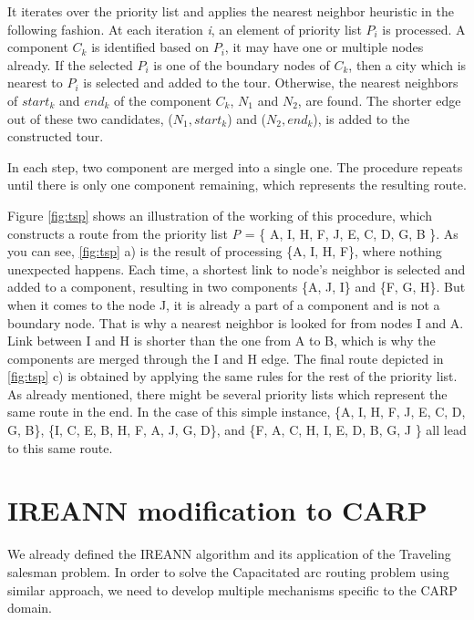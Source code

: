 \documentclass[twoside]{ctuthesis}
\theoremstyle{plain}
\theoremstyle{definition}
\theoremstyle{note}
\begin{document}
It iterates over the priority list and applies the nearest neighbor heuristic in the following fashion. At each iteration \emph{i}, an element of priority list \emph{$ P_i $} is processed. A component \emph{$ C_k $} is identified based on \emph{$ P_i $}, it may have one or multiple nodes already. If the selected \emph{$ P_i $} is one of the boundary nodes of \emph{$ C_k $}, then a city which is nearest to \emph{$ P_i $} is selected and added to the tour. Otherwise, the nearest neighbors of \emph{$ start_k $} and \emph{$ end_k $} of the component \emph{$ C_k $}, \emph{$ N_1 $} and \emph{$ N_2 $}, are found.
The shorter edge out of these two candidates, (\emph{$ N_1, start_k $}) and (\emph{$ N_2, end_k $}), is added to the constructed tour. 

In each step, two component are merged into a single one. The procedure repeats until there is only one component remaining, which represents the resulting route.

Figure \ref{fig:tsp} shows an illustration of the working of this procedure, which constructs a route from the priority list \emph{P} = \{ A, I, H, F, J, E, C, D, G, B \}. As you can see, \ref{fig:tsp} a) is the result of processing \{A, I, H, F\}, where nothing unexpected happens. Each time, a shortest link to node's neighbor is selected and added to a component, resulting in two components \{A, J, I\} and \{F, G, H\}. But when it comes to the node J, it is already a part of a component and is not a boundary node. That is why a nearest neighbor is looked for from nodes I and A. Link between I and H is shorter than the one from A to B, which is why the components are merged through the I and H edge. The final route depicted in \ref{fig:tsp} c) is obtained by applying the same rules for the rest of the priority list.
As already mentioned, there might be several priority lists which represent the same route in the end. In the case of this simple instance,  \{A, I, H, F, J, E, C, D, G, B\}, \{I, C, E, B, H, F, A, J, G, D\}, and \{F, A, C, H, I, E, D, B, G, J \} all lead to this same route. 

\section{IREANN modification to CARP}
We already defined the IREANN algorithm and its application of the Traveling salesman problem. In order to solve the Capacitated arc routing problem using similar approach, we need to develop multiple mechanisms specific to the CARP domain.
\end{document}
